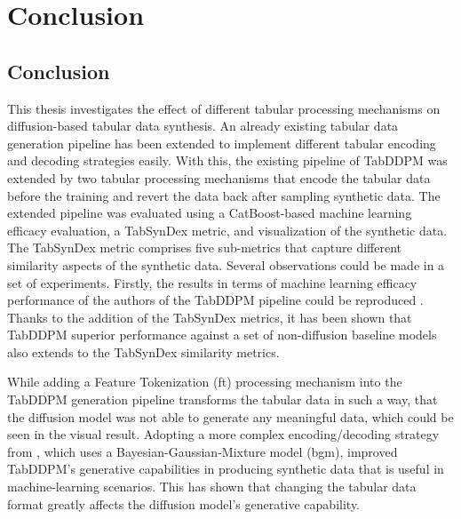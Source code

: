 \chapter{Conclusion}
\label{ch:conclusion}

\section*{Conclusion}
\label{ch:conclusion}

This thesis investigates the effect of different tabular processing mechanisms on diffusion-based tabular data synthesis.
An already existing tabular data generation pipeline has been extended to implement different tabular encoding and decoding strategies easily.
With this, the existing pipeline of TabDDPM \cite{kotelnikov2022TabDDPMModellingTabular} was extended by two tabular processing mechanisms that encode the tabular data before the training and revert the data back after sampling synthetic data.
The extended pipeline was evaluated using a CatBoost-based machine learning efficacy evaluation, a TabSynDex metric, and visualization of the synthetic data.
The TabSynDex metric comprises five sub-metrics that capture different similarity aspects of the synthetic data.
Several observations could be made in a set of experiments.
Firstly, the results in terms of machine learning efficacy performance of the authors of the TabDDPM pipeline could be reproduced \cite{kotelnikov2022TabDDPMModellingTabular}.
Thanks to the addition of the TabSynDex metrics, it has been shown that TabDDPM superior performance against a set of non-diffusion baseline models also extends to the TabSynDex similarity metrics.

While adding a Feature Tokenization (\gls{ft}) processing mechanism into the TabDDPM generation pipeline transforms the tabular data in such a way,
that the diffusion model was not able to generate any meaningful data, which could be seen in the visual result.
Adopting a more complex encoding/decoding strategy from \cite{zhao2022CTABGANEnhancingTabular}, which uses a Bayesian-Gaussian-Mixture model (\gls{bgm}),
improved TabDDPM's generative capabilities in producing synthetic data that is useful in machine-learning scenarios.
This has shown that changing the tabular data format greatly affects the diffusion model's generative capability.

